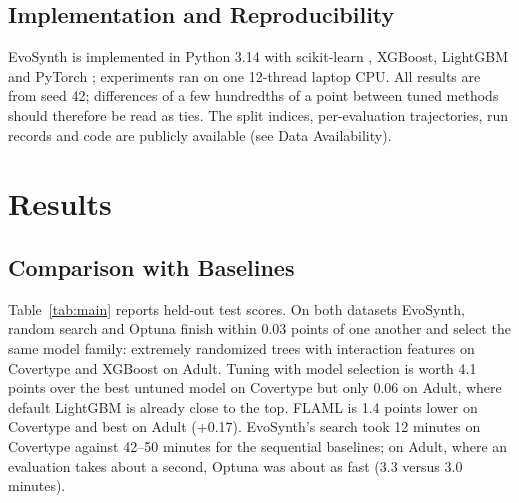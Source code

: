 \documentclass[conference]{IEEEtran}
\begin{document}
\subsection{Implementation and Reproducibility}
EvoSynth is implemented in Python 3.14 with scikit-learn \cite{pedregosa2011scikit}, XGBoost, LightGBM and PyTorch \cite{paszke2019pytorch}; experiments ran on one 12-thread laptop CPU. All results are from seed 42; differences of a few hundredths of a point between tuned methods should therefore be read as ties. The split indices, per-evaluation trajectories, run records and code are publicly available (see Data Availability).

\section{Results}\label{sec:results}

\subsection{Comparison with Baselines}
Table~\ref{tab:main} reports held-out test scores. On both datasets EvoSynth, random search and Optuna finish within 0.03 points of one another and select the same model family: extremely randomized trees with interaction features on Covertype and XGBoost on Adult. Tuning with model selection is worth 4.1 points over the best untuned model on Covertype but only 0.06 on Adult, where default LightGBM is already close to the top. FLAML is 1.4 points lower on Covertype and best on Adult (+0.17). EvoSynth's search took 12 minutes on Covertype against 42--50 minutes for the sequential baselines; on Adult, where an evaluation takes about a second, Optuna was about as fast (3.3 versus 3.0 minutes).
\end{document}
